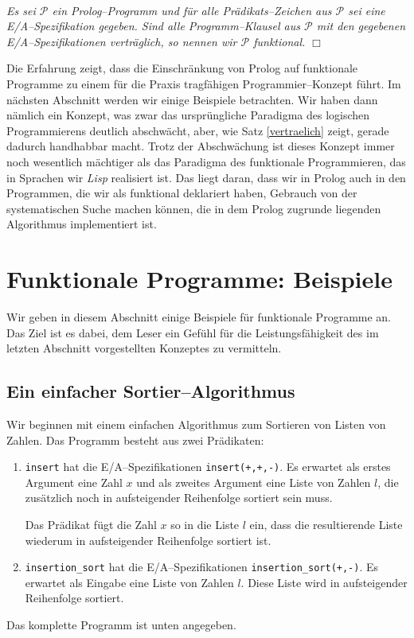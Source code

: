 \begin{Definition} \hspace*{\fill} \\
{\em
    Es sei $\mathcal{P}$ ein Prolog--Programm und f\"{u}r alle Pr\"{a}dikats--Zeichen aus $\mathcal{P}$ sei eine E/A--Spezifikation gegeben.
    Sind alle Programm--Klausel aus $\mathcal{P}$ mit den gegebenen E/A--Spezifikationen vertr\"{a}glich, so nennen wir $\mathcal{P}$
    \emph{funktional}.
}     \hspace*{\fill} $\Box$  
\end{Definition}

Die Erfahrung zeigt, dass die Einschr\"{a}nkung von Prolog auf funktionale Programme zu einem f\"{u}r die Praxis 
tragf\"{a}higen Programmier--Konzept f\"{u}hrt.  Im n\"{a}chsten Abschnitt werden wir einige Beispiele betrachten.
Wir haben dann n\"{a}mlich ein Konzept, was zwar das urspr\"{u}ngliche Paradigma des logischen Programmierens deutlich abschw\"{a}cht, 
aber, wie Satz \ref{vertraelich} zeigt, gerade dadurch handhabbar macht.
Trotz der Abschw\"{a}chung ist dieses Konzept immer noch wesentlich m\"{a}chtiger als das Paradigma des 
 funktionale Programmieren, das in Sprachen wir \textsl{Lisp} realisiert ist.
Das liegt daran, dass wir in Prolog auch in den Programmen, die wir als funktional deklariert haben, 
Gebrauch von der systematischen Suche machen k\"{o}nnen, die in dem Prolog zugrunde liegenden Algorithmus
implementiert ist.

\section{Funktionale Programme: Beispiele}
Wir geben in diesem Abschnitt einige Beispiele f\"{u}r funktionale Programme an.  
Das Ziel ist es dabei, dem Leser ein Gef\"{u}hl f\"{u}r die Leistungsf\"{a}higkeit des im letzten 
Abschnitt vorgestellten Konzeptes zu vermitteln.

\subsection{Ein einfacher Sortier--Algorithmus}
Wir beginnen mit einem einfachen Algorithmus zum Sortieren von Listen von Zahlen.
Das Programm besteht aus zwei Pr\"{a}dikaten:
\begin{enumerate}
\item \texttt{insert} hat die E/A--Spezifikationen \texttt{insert(+,+,-)}.  Es erwartet
      als erstes Argument eine Zahl $x$ und als zweites Argument eine Liste von Zahlen $l$,
      die zus\"{a}tzlich noch in aufsteigender Reihenfolge sortiert sein muss.

      Das Pr\"{a}dikat f\"{u}gt die Zahl $x$ so in die Liste $l$ ein, dass die resultierende Liste
      wiederum in aufsteigender Reihenfolge sortiert ist.
\item \texttt{insertion\_sort} hat die E/A--Spezifikationen \texttt{insertion\_sort(+,-)}.
      Es erwartet als Eingabe eine Liste von Zahlen $l$.  Diese Liste wird in aufsteigender Reihenfolge sortiert.
\end{enumerate}
Das komplette Programm ist unten angegeben.

